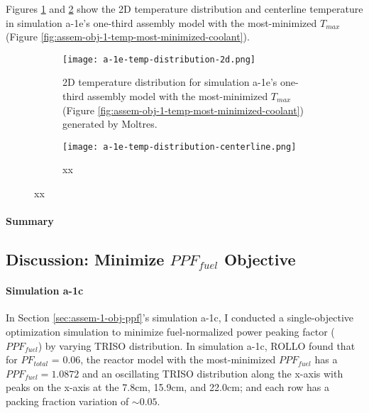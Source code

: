 Figures \ref{fig:a-1e-temp-distribution-2d} and \ref{fig:a-1e-temp-distribution-centerline}
show the 2D temperature distribution and centerline temperature in simulation a-1e's 
one-third assembly model with the most-minimized $T_{max}$ (Figure 
\ref{fig:assem-obj-1-temp-most-minimized-coolant}). 
\begin{figure}[htbp!]
    \begin{subfigure}{\textwidth}
        \centering
        \texttt{[image: a-1e-temp-distribution-2d.png]}
        \caption{2D temperature distribution for simulation a-1e's one-third assembly model 
        with the most-minimized $T_{max}$ (Figure 
        \ref{fig:assem-obj-1-temp-most-minimized-coolant}) generated by Moltres.}
        \label{fig:a-1e-temp-distribution-2d} 
    \end{subfigure}
    \begin{subfigure}{\textwidth}
        \centering
        \texttt{[image: a-1e-temp-distribution-centerline.png]}
        \caption{xx }
        \label{fig:a-1e-temp-distribution-centerline} 
    \end{subfigure}
    \caption{xx}
    \label{fig:a-1e-temp-distribution}
\end{figure}


\paragraph{Summary}


\subsection{Discussion: Minimize $PPF_{fuel}$ Objective}
\label{sec:assem-discussion-ppf}
\paragraph{Simulation a-1c}
In Section \ref{sec:assem-1-obj-ppf}'s simulation a-1c, I conducted a single-objective 
optimization simulation to minimize fuel-normalized power peaking factor ($PPF_{fuel}$) 
by varying TRISO distribution. 
In simulation a-1c, \gls{ROLLO} found that for $PF_{total}$ = 0.06, the reactor model 
with the most-minimized $PPF_{fuel}$ has a $PPF_{fuel} = 1.0872$ and an oscillating 
TRISO distribution along the x-axis with peaks on the x-axis at the 7.8cm, 
15.9cm, and 22.0cm; and each row has a packing fraction variation of $\sim0.05$.

